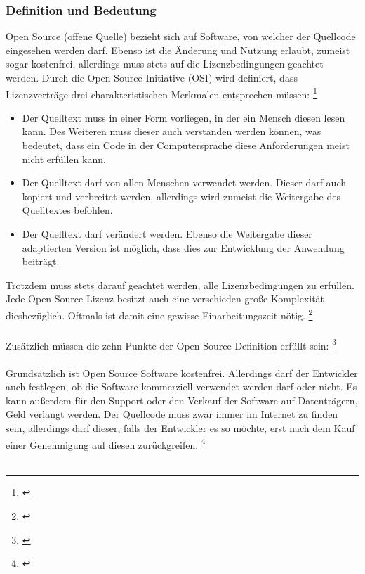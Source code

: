 \documentclass[titlepage,12pt,twoside]{article}
\begin{document}
\subsubsection{Definition und Bedeutung}
Open Source (offene Quelle) bezieht sich auf Software, von welcher der Quellcode eingesehen werden darf. 
Ebenso ist die Änderung und Nutzung erlaubt, zumeist sogar kostenfrei, allerdings muss stets auf die 
Lizenzbedingungen geachtet werden. Durch die Open Source Initiative (OSI) wird definiert, dass Lizenzverträge 
drei charakteristischen Merkmalen entsprechen müssen: \footnote{\cite{WikipediaOpenSource}} \\
\begin{itemize}
	\item Der Quelltext muss in einer Form vorliegen, in der ein Mensch diesen lesen kann. Des Weiteren muss 
	dieser auch verstanden werden können, was bedeutet, dass ein Code in der Computersprache diese 
	Anforderungen meist nicht erfüllen kann. 
	\item Der Quelltext darf von allen Menschen verwendet werden. Dieser darf auch kopiert und verbreitet 
	werden, allerdings wird zumeist die Weitergabe des Quelltextes befohlen.
	\item Der Quelltext darf verändert werden. Ebenso die Weitergabe dieser adaptierten Version ist möglich, 
	dass dies zur Entwicklung der Anwendung beiträgt. 
\end{itemize}
\hfill \break
Trotzdem muss stets darauf geachtet werden, alle Lizenzbedingungen zu erfüllen. Jede Open Source Lizenz 
besitzt auch eine verschieden große Komplexität diesbezüglich. Oftmals ist damit eine gewisse 
Einarbeitungszeit nötig. \footnote{\cite{WikipediaOpenSource12}} \\
\\
Zusätzlich müssen die zehn Punkte der Open Source Definition erfüllt sein:  \footnote{\cite{Opensource}} \\
\\
Grundsätzlich ist Open Source Software kostenfrei. Allerdings darf der Entwickler auch festlegen, ob die 
Software kommerziell verwendet werden darf oder nicht. Es kann außerdem für den Support oder den Verkauf 
der Software auf Datenträgern, Geld verlangt werden. Der Quellcode muss zwar immer im Internet zu finden sein, 
allerdings darf dieser, falls der Entwickler es so möchte, erst nach dem Kauf einer Genehmigung auf diesen 
zurückgreifen. \footnote{\cite{Giga}} \\
\\
\end{document}
